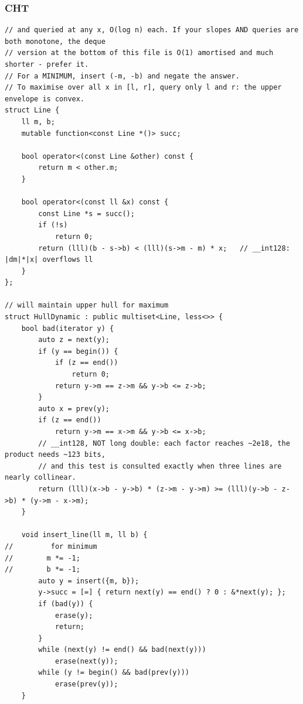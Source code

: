 \documentclass[9pt,a4paper,twocolumn]{extarticle}
\begin{document}
\subsubsection{CHT}
\nopagebreak
\begin{lstlisting}
// and queried at any x, O(log n) each. If your slopes AND queries are both monotone, the deque
// version at the bottom of this file is O(1) amortised and much shorter - prefer it.
// For a MINIMUM, insert (-m, -b) and negate the answer.
// To maximise over all x in [l, r], query only l and r: the upper envelope is convex.
struct Line {
    ll m, b;
    mutable function<const Line *()> succ;

    bool operator<(const Line &other) const {
        return m < other.m;
    }

    bool operator<(const ll &x) const {
        const Line *s = succ();
        if (!s)
            return 0;
        return (lll)(b - s->b) < (lll)(s->m - m) * x;   // __int128: |dm|*|x| overflows ll
    }
};

// will maintain upper hull for maximum
struct HullDynamic : public multiset<Line, less<>> {
    bool bad(iterator y) {
        auto z = next(y);
        if (y == begin()) {
            if (z == end())
                return 0;
            return y->m == z->m && y->b <= z->b;
        }
        auto x = prev(y);
        if (z == end())
            return y->m == x->m && y->b <= x->b;
        // __int128, NOT long double: each factor reaches ~2e18, the product needs ~123 bits,
        // and this test is consulted exactly when three lines are nearly collinear.
        return (lll)(x->b - y->b) * (z->m - y->m) >= (lll)(y->b - z->b) * (y->m - x->m);
    }

    void insert_line(ll m, ll b) {
//         for minimum
//        m *= -1;
//        b *= -1;
        auto y = insert({m, b});
        y->succ = [=] { return next(y) == end() ? 0 : &*next(y); };
        if (bad(y)) {
            erase(y);
            return;
        }
        while (next(y) != end() && bad(next(y)))
            erase(next(y));
        while (y != begin() && bad(prev(y)))
            erase(prev(y));
    }


\end{lstlisting}
\end{document}
